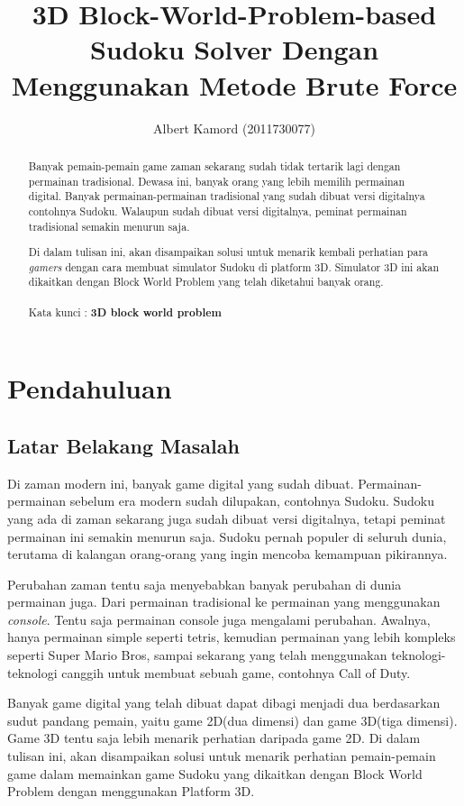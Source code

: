 \documentclass[11pt,a4paper]{report}
\author{Albert Kamord (2011730077)}
\title{3D Block-World-Problem-based Sudoku Solver Dengan Menggunakan Metode Brute Force}
\begin{document}
\maketitle
\begin{abstract}

\indent Banyak pemain-pemain game zaman sekarang sudah tidak tertarik lagi dengan permainan tradisional. Dewasa ini, banyak orang yang lebih memilih permainan digital. Banyak permainan-permainan tradisional yang sudah dibuat versi digitalnya contohnya Sudoku. Walaupun sudah dibuat versi digitalnya, peminat permainan tradisional semakin menurun saja.

\indent Di dalam tulisan ini, akan disampaikan solusi untuk menarik kembali perhatian para \textit{gamers} dengan cara membuat simulator Sudoku di platform 3D. Simulator 3D ini akan dikaitkan dengan Block World Problem yang telah diketahui banyak orang. \\
\\
Kata kunci : \textbf{3D block world problem}
\end{abstract}

\tableofcontents \newpage 	%
\listoffigures \newpage 	%


\chapter{Pendahuluan} %
\section{Latar Belakang Masalah}
\indent Di zaman modern ini, banyak game digital yang sudah dibuat. Permainan-permainan sebelum era modern sudah dilupakan, contohnya Sudoku. Sudoku yang ada di zaman sekarang juga sudah dibuat versi digitalnya, tetapi peminat permainan ini semakin menurun saja. Sudoku pernah populer di seluruh dunia, terutama di kalangan orang-orang yang ingin mencoba kemampuan pikirannya.

\indent Perubahan zaman tentu saja menyebabkan banyak perubahan di dunia permainan juga. Dari permainan tradisional ke permainan yang menggunakan \textit{console}. Tentu saja permainan console juga mengalami perubahan. Awalnya, hanya permainan simple seperti tetris, kemudian permainan yang lebih kompleks seperti Super Mario Bros, sampai sekarang yang telah menggunakan teknologi-teknologi canggih untuk membuat sebuah game, contohnya Call of Duty.

\indent Banyak game digital yang telah dibuat dapat dibagi menjadi dua berdasarkan sudut pandang pemain, yaitu game 2D(dua dimensi) dan game 3D(tiga dimensi). Game 3D tentu saja lebih menarik perhatian daripada game 2D. Di dalam tulisan ini, akan disampaikan solusi untuk menarik perhatian pemain-pemain game dalam memainkan game Sudoku yang dikaitkan dengan Block World Problem dengan menggunakan Platform 3D.
\end{document}
